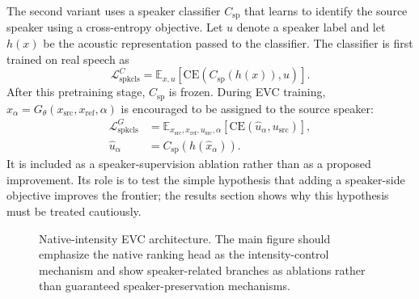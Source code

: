 The second variant uses a speaker classifier $C_{\text{sp}}$ that learns to identify the source speaker using a cross-entropy objective.
Let $u$ denote a speaker label and let $h(x)$ be the acoustic representation passed to the classifier.
The classifier is first trained on real speech as
\begin{equation}
\mathcal{L}_{\mathrm{spkcls}}^{C}
=
\mathbb{E}_{x,u}
\left[
\mathrm{CE}\left(C_{\text{sp}}(h(x)),u\right)
\right].
\end{equation}
After this pretraining stage, $C_{\text{sp}}$ is frozen.
During EVC training, $\hat{x}_{\alpha}=G_\theta(x_{\mathrm{src}},x_{\mathrm{ref}},\alpha)$ is encouraged to be assigned to the source speaker:
\begin{align}
\mathcal{L}_{\mathrm{spkcls}}^{G}
&=
\mathbb{E}_{x_{\mathrm{src}},x_{\mathrm{ref}},u_{\mathrm{src}},\alpha}
\left[
\mathrm{CE}\left(\hat{u}_{\alpha},u_{\mathrm{src}}\right)
\right],
\nonumber\\
\hat{u}_{\alpha}
&=
C_{\text{sp}}\!\left(h(\hat{x}_{\alpha})\right).
\end{align}
It is included as a speaker-supervision ablation rather than as a proposed improvement.
Its role is to test the simple hypothesis that adding a speaker-side objective improves the frontier; the results section shows why this hypothesis must be treated cautiously.

\begin{figure}[t]
\centering
{}
\caption{Native-intensity EVC architecture. The main figure should emphasize the native ranking head as the intensity-control mechanism and show speaker-related branches as ablations rather than guaranteed speaker-preservation mechanisms.}
\label{fig:architecture}
\end{figure}

